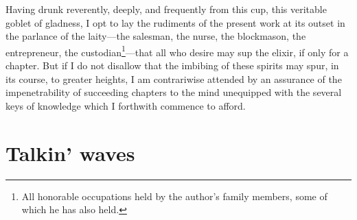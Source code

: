 Having drunk reverently, deeply, and frequently from this cup, this
veritable goblet of gladness, I opt to lay the rudiments of the
present work at its outset in the parlance of the laity---the
salesman, the nurse, the blockmason, the entrepreneur, the
custodian\footnote{All honorable occupations held by the author's
  family members, some of which he has also held.}---that all who
desire may sup the elixir, if only for a chapter. But if I do not
disallow that the imbibing of these spirits may spur, in its course,
to greater heights, I am contrariwise attended by an assurance of the
impenetrability of succeeding chapters to the mind unequipped with the
several keys of knowledge which I forthwith commence to afford.

\section{Talkin' waves}














